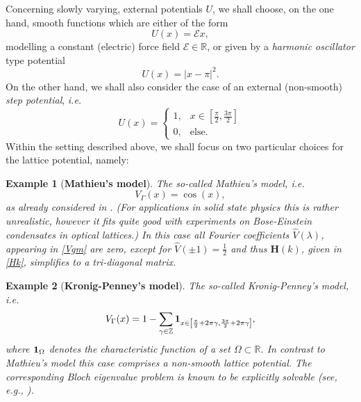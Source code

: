 \documentclass[leqno,final]{siamltex}
\makeatletter
\newtheorem{example}{Example}[section]
{\catcode `\@=11 \global\let\AddToReset=\@addtoreset}
\numberwithin{equation}{section}
\newcounter{me}
\makeatother
\begin{document}
Concerning slowly varying, external potentials $U$, we shall
choose, on the one hand, smooth functions which are either of the
form \begin{equation} \label{eqlin} U(x) = \mathcal E x, \end{equation} modelling a
constant (electric) force field $\mathcal E \in {{\mathbb R}}$, or given by a
\emph{harmonic oscillator} type potential \begin{equation}\label{eqhar_p}
U(x)=|x-\pi|^2. \end{equation} On the other hand, we shall also consider the
case of an external (non-smooth) \emph{step potential}, {{\sl i.e.\/ }}
\begin{equation}\label{eqstep}
U(x)=\left\{\begin{array}{ll}1, & x\in \left[{\frac{{\pi}}{{2}}},{\frac{{3\pi}}{{2}}}\right]\\
0, & \mbox{else} . \end{array}\right. \end{equation} Within the setting described
above, we shall focus on two particular choices for the lattice
potential, namely:

\begin{example}[\textbf{Mathieu's model}]\label{nuex1}
The so-called \emph{Mathieu's model}, {{\sl i.e.\/ }} \begin{equation} \label{mathieu}
V_{\Gamma}(x)=\cos(x), \end{equation} as already considered in \cite{GoMa}. (For
applications in solid state physics this is rather unrealistic,
however it fits quite good with experiments on Bose-Einstein
condensates in optical lattices.) In this case all Fourier
coefficients $\widehat V(\lambda)$, appearing in \eqref{Vgm} are
zero, except for $\widehat V(\pm 1 ) = \frac{1}{2}$ and thus
${{\mathbf H}}(k)$, given in \eqref{Hk}, simplifies to a tri-diagonal matrix.
\end{example}

\begin{example}[\textbf{Kronig-Penney's model}]\label{nuex2}
The so-called \emph{Kronig-Penney's model}, {{\sl i.e.\/ }} \begin{equation} \label{KrP}
V_{\Gamma}(x)=1-\sum_{\gamma \in{{\mathbb Z }}}{\bf 1}_{x\in\left[{\frac{{\pi}}{{2}}}+2\pi
\gamma,{\frac{{3\pi}}{{2}}}+2 \pi \gamma\right]}, \end{equation} where ${\bf
1}_{\Omega}$ denotes the characteristic function of a set $\Omega
\subset {{\mathbb R}}$. In contrast to Mathieu's model this case comprises a
non-smooth lattice potential. The corresponding Bloch eigenvalue
problem is known to be explicitly solvable (see, {{\sl e.g.\/}},
\cite{GoMa}).
\end{example}
\end{document}
